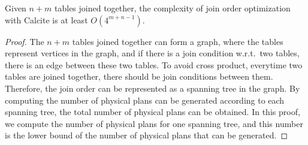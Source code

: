 \begin{theorem}
    \label{theorem:complexity-of-calcite}
    Given $n + m$ tables joined together, the complexity of join order optimization with Calcite is at least $O(4^{m+n-1})$.
\end{theorem}
\begin{proof}
    The $n + m$ tables joined together can form a graph, where the tables represent vertices in the graph, and if there is a join condition w.r.t.~two tables, there is an edge between these two tables.
    To avoid cross product, everytime two tables are joined together, there should be join conditions between them.
    Therefore, the join order can be represented as a spanning tree in the graph.
    By computing the number of physical plans can be generated according to each spanning tree, the total number of physical plans can be obtained.
    In this proof, we compute the number of physical plans for one spanning tree, and this number is the lower bound of the number of physical plans that can be generated.


\end{proof}
